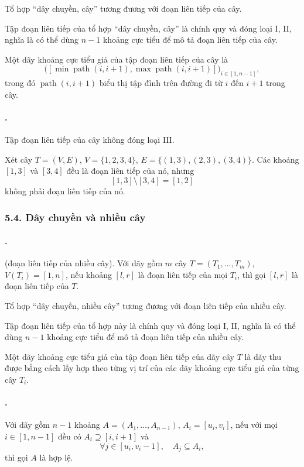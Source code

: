 \documentclass[11pt]{article}
\begin{document}
Tổ hợp ``dây chuyền, cây'' tương đương với đoạn liên tiếp của cây.

Tập đoạn liên tiếp của tổ hợp ``dây chuyền, cây'' là chính quy và đóng loại I,
II, nghĩa là có thể dùng $n-1$ khoảng cực tiểu để mô tả đoạn liên tiếp của
cây.

Một dãy khoảng cực tiểu giả của tập đoạn liên tiếp của cây là
\[
  \bigl([\min \operatorname{path}(i,i+1),
  \max \operatorname{path}(i,i+1)]\bigr)_{i\in[1,n-1]},
\]
trong đó $\operatorname{path}(i,i+1)$ biểu thị tập đỉnh trên đường đi từ $i$
đến $i+1$ trong cây.

\paragraph{.}
Tập đoạn liên tiếp của cây không đóng loại III.

Xét cây $T=(V,E)$, $V=\{1,2,3,4\}$,
$E=\{(1,3),(2,3),(3,4)\}$. Các khoảng $[1,3]$ và $[3,4]$ đều là đoạn liên tiếp
của nó, nhưng
\[
  [1,3]\setminus[3,4]=[1,2]
\]
không phải đoạn liên tiếp của nó.

\subsubsection*{5.4. Dây chuyền và nhiều cây}

\paragraph{.}
 (đoạn liên tiếp của nhiều cây). Với dãy gồm $m$ cây
$T=(T_1,\ldots,T_m)$, $V(T_i)=[1,n]$, nếu khoảng $[l,r]$ là đoạn liên tiếp của
mọi $T_i$, thì gọi $[l,r]$ là đoạn liên tiếp của $T$.

Tổ hợp ``dây chuyền, nhiều cây'' tương đương với đoạn liên tiếp của nhiều cây.

Tập đoạn liên tiếp của tổ hợp này là chính quy và đóng loại I, II, nghĩa là có
thể dùng $n-1$ khoảng cực tiểu để mô tả đoạn liên tiếp của nhiều cây.

Một dãy khoảng cực tiểu giả của tập đoạn liên tiếp của dãy cây $T$ là dãy thu
được bằng cách lấy hợp theo từng vị trí của các dãy khoảng cực tiểu giả của
từng cây $T_i$.

\paragraph{.}
Với dãy gồm $n-1$ khoảng $A=(A_1,\ldots,A_{n-1})$, $A_i=[u_i,v_i]$, nếu với
mọi $i\in[1,n-1]$ đều có $A_i\supseteq[i,i+1]$ và
\[
  \forall j\in[u_i,v_i-1],\quad A_j\subseteq A_i,
\]
thì gọi $A$ là hợp lệ.
\end{document}

